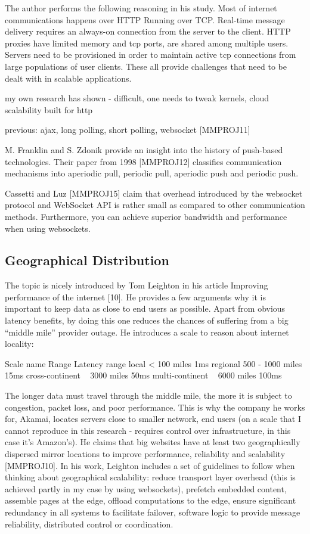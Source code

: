 \documentclass{uvamscse}
\begin{document}
The author performs the following reasoning in his study. Most of internet communications happens over HTTP Running over TCP. Real-time message delivery requires an always-on connection from the server to the client. HTTP proxies have limited memory and tcp ports, are shared among multiple users. Servers need to be provisioned in order to maintain active tcp connections from large populations of user clients. These all provide challenges that need to be dealt with in scalable applications.

my own research has shown - difficult, one needs to tweak kernels, cloud scalability built for http

previous: ajax, long polling, short polling, websocket [MMPROJ11]

M. Franklin and S. Zdonik provide an insight into the history of push-based technologies. Their paper from 1998 [MMPROJ12] classifies communication mechanisms into aperiodic pull, periodic pull, aperiodic push and periodic push.

Cassetti and Luz [MMPROJ15] claim that overhead introduced by the websocket protocol and WebSocket API is rather small as compared to other communication methods. Furthermore, you can achieve superior bandwidth and performance when using websockets.

\subsection{Geographical Distribution}

The topic is nicely introduced by Tom Leighton in his article Improving performance of the internet [10]. He provides a few arguments why it is important to keep data as close to end users as possible. Apart from obvious latency benefits, by doing this one reduces the chances of suffering from a big “middle mile” provider outage.
He introduces a scale to reason about internet locality:

Scale name
Range
Latency range
local
< 100 miles
1ms
regional
500 - 1000 miles
15ms
cross-continent
~ 3000 miles
50ms
multi-continent
~ 6000 miles
100ms

The longer data must travel through the middle mile, the more it is subject to congestion, packet loss, and poor performance. This is why the company he works for, Akamai, locates servers close to smaller network, end users (on a scale that I cannot reproduce in this research - requires control over infrastructure, in this case it's Amazon's). He claims that big websites have at least two geographically dispersed mirror locations to improve performance, reliability and scalability [MMPROJ10].
In his work, Leighton includes a set of guidelines to follow when thinking about geographical scalability:
reduce transport layer overhead (this is achieved partly in my case by using websockets),
prefetch embedded content,
assemble pages at the edge,
offload computations to the edge,
ensure significant redundancy in all systems to facilitate failover,
software logic to provide message reliability,
distributed control or coordination.
\end{document}
